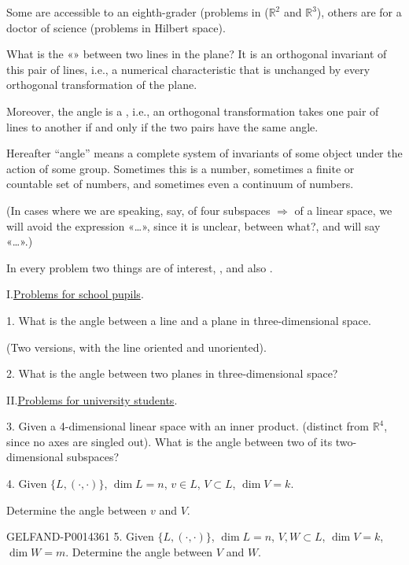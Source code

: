 Some are accessible to an eighth-grader (problems in (\(\mathbb R^2\) and \(\mathbb R^3\)),
others are for a doctor of science (problems in Hilbert space).

What is the «» between two lines in the plane?
It is an orthogonal invariant of this pair of lines, i.e., a numerical characteristic that is unchanged by every orthogonal transformation of the plane.

Moreover, the angle is a , i.e., an orthogonal transformation takes one pair of lines to another if and only if the two pairs have the same angle.

Hereafter “angle” means a complete system of invariants of some object under the action of some group. Sometimes this is a number, sometimes a finite or countable set of numbers, and sometimes even a continuum of numbers.

(In cases where we are speaking, say, of four subspaces \(\Rightarrow\) of a linear space,
we will avoid the expression «\ldots»,
since it is unclear, between what?, and will say «\ldots».)

In every problem two things are of interest, , and also .

\par\noindent I.\quad\uline{Problems for school pupils}.

1. What is the angle between a line and a plane in three-dimensional space.

(Two versions, with the line oriented and unoriented).

2. What is the angle between two planes in three-dimensional space?

\par\noindent II.\quad\uline{Problems for university students}.

3. Given a 4-dimensional linear space with an inner product. (distinct from \(\mathbb R^4\), since no axes are singled out).
What is the angle between two of its two-dimensional subspaces?

4. Given \(\{L,(\cdot,\cdot)\}\), \(\dim L=n\), \(v\in L\),
\(V\subset L\), \(\dim V=k\).

Determine the angle between \(v\) and \(V\).


\begin{GelfandAdjacentEvidence}{GELFAND-P001436}{1}
5. Given \(\{L,(\cdot,\cdot)\}\), \(\dim L=n\), \(V,W\subset L\),
\(\dim V=k\), \(\dim W=m\). Determine the angle between \(V\) and \(W\).
\end{GelfandAdjacentEvidence}


